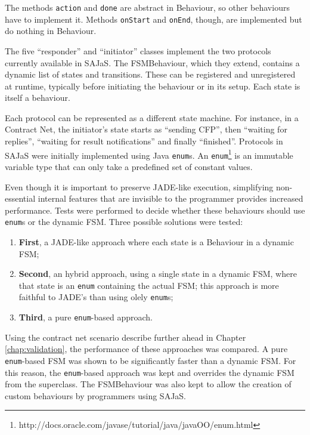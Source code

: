 The methods \texttt{action} and \texttt{done} are abstract in Behaviour, so  other behaviours have to implement it. Methods \texttt{onStart} and \texttt{onEnd}, though, are implemented but do nothing in Behaviour.

The five ``responder'' and ``initiator'' classes implement the two protocols currently available in SAJaS. The FSMBehaviour, which they extend, contains a dynamic list of states and transitions. These can be registered and unregistered at runtime, typically before initiating the behaviour or in its setup. Each state is itself a behaviour.

Each protocol can be represented as a different state machine. For instance, in a Contract Net, the initiator's state starts as ``sending CFP'', then ``waiting for replies'', ``waiting for result notifications'' and finally ``finished''. Protocols in SAJaS were initially implemented using Java \texttt{enum}s. An \texttt{enum}\footnote{http://docs.oracle.com/javase/tutorial/java/javaOO/enum.html} is an immutable variable type that can only take a predefined set of constant values.

Even though it is important to preserve JADE-like execution, simplifying non-essential internal features that are invisible to the programmer provides increased performance. Tests were performed to decide whether these behaviours should use \texttt{enum}s or the dynamic FSM. Three possible solutions were tested:

\begin{enumerate}
	\item \textbf{First}, a JADE-like approach where each state is a Behaviour in a dynamic FSM;
	\item \textbf{Second}, an hybrid approach, using a single state in a dynamic FSM, where that state is an \texttt{enum} containing the actual FSM; this approach is more faithful to JADE's than using olely \texttt{enum}s;
	\item \textbf{Third}, a pure \texttt{enum}-based approach.
\end{enumerate}

Using the contract net scenario describe further ahead in Chapter \ref{chap:validation}, the performance of these approaches was compared. A pure \texttt{enum}-based FSM was shown to be significantly faster than a dynamic FSM. For this reason, the \texttt{enum}-based approach was kept and overrides the dynamic FSM from the superclass. The FSMBehaviour was also kept to allow the creation of custom behaviours by programmers using SAJaS.

